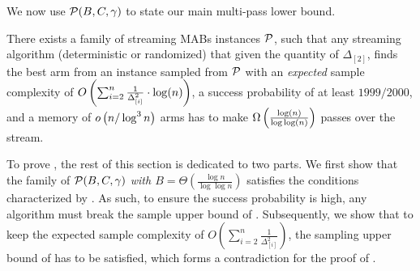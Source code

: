 We now use $\mathcal{P}(B, C, \gamma)$ to state our main multi-pass lower bound. 
\begin{theorem}
	\label{thm:lb-main}
	There exists a family of streaming MABs instances $\mathcal{P}$, such that any streaming algorithm (deterministic or randomized) that given the quantity of $\Delta_{[2]}$, finds the best arm from an instance sampled from $\mathcal{P}$ with an \emph{expected} sample complexity of $O\left(\sum_{i=2}^{n} \frac{1}{\Delta^2_{[i]}} \cdot \log(n)\right)$, a success probability of at least $1999/2000$, and a memory of $o\left(n/\log^3 {n}\right)$ arms has to make $\Omega\left(\frac{\log(n)}{\log\log(n)}\right)$ passes over the stream. 
\end{theorem}


To prove , the rest of this section is dedicated to two parts. We first show that the family of $\mathcal{P}(B, C, \gamma)$ \emph{with $B=\Theta(\frac{\log n}{\log\log n})$} satisfies the conditions characterized by . As such, to ensure the success probability is high, any algorithm must break the sample upper bound of . Subsequently, we show that to keep the expected sample complexity of $O(\sum_{i=2}^{n}\frac{1}{\Delta^2_{[i]}})$, %
the sampling upper bound of  has to be satisfied, which forms a contradiction for the proof of .

